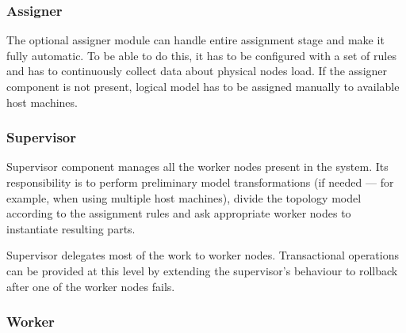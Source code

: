 \documentclass[11pt]{book}
\begin{document}
          \noindent
          \begin{minipage}{\textwidth}
            
          \end{minipage}
          

        \subsubsection{Assigner}

          The optional assigner module can handle entire assignment stage and make it fully automatic. To be able to do
          this, it has to be configured with a set of rules and has to continuously collect data about physical nodes
          load. If the assigner component is not present, logical model has to be assigned manually to available host
          machines.


        \subsubsection{Supervisor}

          Supervisor component manages all the worker nodes present in the system. Its responsibility is to perform
          preliminary model transformations (if needed --- for example, when using multiple host machines), divide the
          topology model according to the assignment rules and ask appropriate worker nodes to instantiate resulting
          parts.

          Supervisor delegates most of the work to worker nodes. Transactional operations can be provided at this level
          by extending the supervisor's behaviour to rollback after one of the worker nodes fails. \\


          \noindent
          \begin{minipage}{\textwidth}
            
          \end{minipage}


        \subsubsection{Worker}
\end{document}
